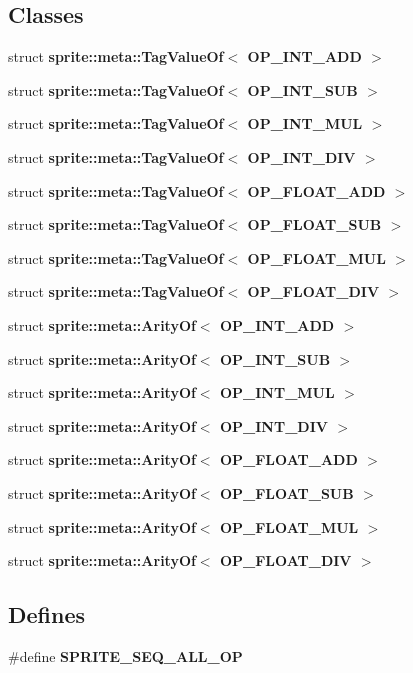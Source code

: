 \subsection*{Classes}
\begin{CompactItemize}
\item 
struct {\bf sprite::meta::Tag\-Value\-Of$<$ OP\_\-INT\_\-ADD $>$}
\item 
struct {\bf sprite::meta::Tag\-Value\-Of$<$ OP\_\-INT\_\-SUB $>$}
\item 
struct {\bf sprite::meta::Tag\-Value\-Of$<$ OP\_\-INT\_\-MUL $>$}
\item 
struct {\bf sprite::meta::Tag\-Value\-Of$<$ OP\_\-INT\_\-DIV $>$}
\item 
struct {\bf sprite::meta::Tag\-Value\-Of$<$ OP\_\-FLOAT\_\-ADD $>$}
\item 
struct {\bf sprite::meta::Tag\-Value\-Of$<$ OP\_\-FLOAT\_\-SUB $>$}
\item 
struct {\bf sprite::meta::Tag\-Value\-Of$<$ OP\_\-FLOAT\_\-MUL $>$}
\item 
struct {\bf sprite::meta::Tag\-Value\-Of$<$ OP\_\-FLOAT\_\-DIV $>$}
\item 
struct {\bf sprite::meta::Arity\-Of$<$ OP\_\-INT\_\-ADD $>$}
\item 
struct {\bf sprite::meta::Arity\-Of$<$ OP\_\-INT\_\-SUB $>$}
\item 
struct {\bf sprite::meta::Arity\-Of$<$ OP\_\-INT\_\-MUL $>$}
\item 
struct {\bf sprite::meta::Arity\-Of$<$ OP\_\-INT\_\-DIV $>$}
\item 
struct {\bf sprite::meta::Arity\-Of$<$ OP\_\-FLOAT\_\-ADD $>$}
\item 
struct {\bf sprite::meta::Arity\-Of$<$ OP\_\-FLOAT\_\-SUB $>$}
\item 
struct {\bf sprite::meta::Arity\-Of$<$ OP\_\-FLOAT\_\-MUL $>$}
\item 
struct {\bf sprite::meta::Arity\-Of$<$ OP\_\-FLOAT\_\-DIV $>$}
\end{CompactItemize}
\subsection*{Defines}
\begin{CompactItemize}
\item 
\#define {\bf SPRITE\_\-SEQ\_\-ALL\_\-OP}
\end{CompactItemize}
